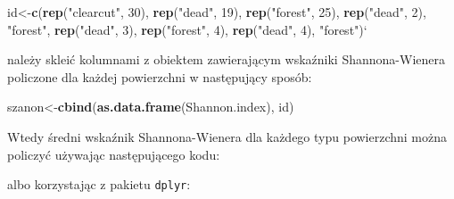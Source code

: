 \documentclass[]{article}
\newenvironment{Shaded}{\begin{snugshade}}{\end{snugshade}}
\newcommand{\KeywordTok}[1]{\textcolor[rgb]{0.13,0.29,0.53}{\textbf{#1}}}
\newcommand{\DataTypeTok}[1]{\textcolor[rgb]{0.13,0.29,0.53}{#1}}
\newcommand{\DecValTok}[1]{\textcolor[rgb]{0.00,0.00,0.81}{#1}}
\newcommand{\StringTok}[1]{\textcolor[rgb]{0.31,0.60,0.02}{#1}}
\newcommand{\OperatorTok}[1]{\textcolor[rgb]{0.81,0.36,0.00}{\textbf{#1}}}
\newcommand{\NormalTok}[1]{#1}
\begin{document}
\begin{Shaded}
\begin{Highlighting}[]
\NormalTok{id<-}\KeywordTok{c}\NormalTok{(}\KeywordTok{rep}\NormalTok{(}\StringTok{"clearcut"}\NormalTok{, }\DecValTok{30}\NormalTok{), }\KeywordTok{rep}\NormalTok{(}\StringTok{"dead"}\NormalTok{, }\DecValTok{19}\NormalTok{), }\KeywordTok{rep}\NormalTok{(}\StringTok{"forest"}\NormalTok{, }\DecValTok{25}\NormalTok{), }\KeywordTok{rep}\NormalTok{(}\StringTok{"dead"}\NormalTok{, }\DecValTok{2}\NormalTok{),}
      \StringTok{"forest"}\NormalTok{, }\KeywordTok{rep}\NormalTok{(}\StringTok{"dead"}\NormalTok{, }\DecValTok{3}\NormalTok{), }\KeywordTok{rep}\NormalTok{(}\StringTok{"forest"}\NormalTok{, }\DecValTok{4}\NormalTok{), }\KeywordTok{rep}\NormalTok{(}\StringTok{"dead"}\NormalTok{, }\DecValTok{4}\NormalTok{), }\StringTok{"forest"}\NormalTok{)}\StringTok{`}
\end{Highlighting}
\end{Shaded}

należy skleić kolumnami z obiektem zawierającym wskaźniki
Shannona-Wienera policzone dla każdej powierzchni w następujący sposób:

\begin{Shaded}
\begin{Highlighting}[]
\NormalTok{szanon<-}\KeywordTok{cbind}\NormalTok{(}\KeywordTok{as.data.frame}\NormalTok{(Shannon.index), id)}
\end{Highlighting}
\end{Shaded}

Wtedy średni wskaźnik Shannona-Wienera dla każdego typu powierzchni
można policzyć używając następującego kodu:

\begin{Shaded}
\end{Shaded}

albo korzystając z pakietu \texttt{dplyr}:

\begin{Shaded}
\end{Shaded}
\end{document}
